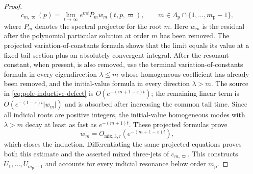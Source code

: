 \documentclass[11pt]{amsart}
\numberwithin{equation}{section}
\theoremstyle{definition}
\theoremstyle{remark}
\begin{document}
\begin{proof}
\begin{equation}
 c_{m,\varpi}(p)
 =\lim_{t\to\infty}e^{mt}P_m w_m(t,p,\varpi),
 \qquad m\in\Lambda_{\mathrm p}\cap
       \{1,\ldots,m_{\mathrm p}-1\},
\end{equation}
where $P_m$ denotes the spectral projector for the root $m$.
Here $w_m$ is the residual after the polynomial particular solution at
order $m$ has been removed.  The projected variation-of-constants formula
shows that the limit equals its value at a fixed tail section plus an
absolutely convergent integral.  After the resonant constant, when
present, is also removed, use the terminal variation-of-constants formula
in every
eigendirection $\lambda\le m$ whose homogeneous coefficient has already
been removed, and the initial-value formula in every direction
$\lambda>m$.  The
source in \eqref{eq:pole-inductive-defect} is
$O(e^{-(m+1-\varepsilon)t})$; the remaining linear term is
$O(e^{-(1-\varepsilon)t}|w_m|)$ and is absorbed after increasing the common
tail time.  Since all indicial roots are positive integers, the
initial-value homogeneous modes with $\lambda>m$ decay at least as fast as
$e^{-(m+1)t}$.  These projected formulas prove
\[
 w_m=O_{\mathrm{mix},3,r}
       (e^{-(m+1-\varepsilon)t}),
\]
which closes the induction.  Differentiating the same projected equations
proves both this estimate and the asserted mixed three-jets of
$c_{m,\varpi}$.  This constructs
$U_1,\ldots,U_{m_{\mathrm p}-1}$ and accounts for every indicial resonance
below order $m_{\mathrm p}$.


\end{proof}
\end{document}
